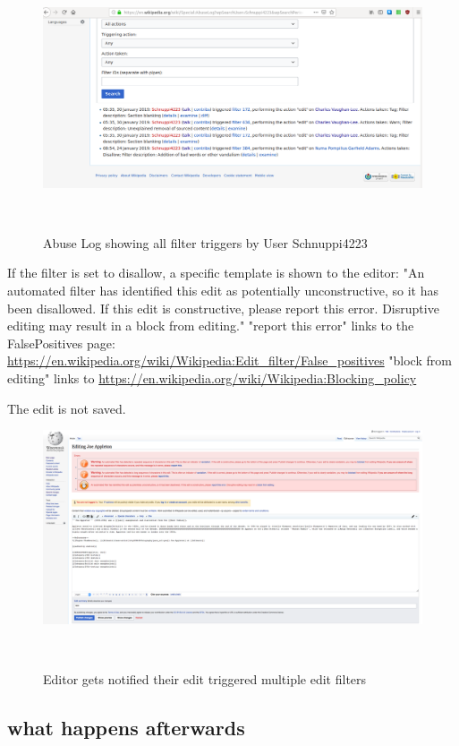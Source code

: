 \begin{figure}
\centering
  \includegraphics[width=0.9\columnwidth]{pics/screenshots-filter-trigger/Screenshot-abuse-log.png}
  \caption{Abuse Log showing all filter triggers by User Schnuppi4223}~\label{fig:screenshot-abuse-log}
\end{figure}

If the filter is set to disallow, a specific template is shown to the editor: "An automated filter has identified this edit as potentially unconstructive, so it has been disallowed. If this edit is constructive, please report this error. Disruptive editing may result in a block from editing."
"report this error" links to the FalsePositives page: \url{https://en.wikipedia.org/wiki/Wikipedia:Edit_filter/False_positives}
"block from editing" links to \url{https://en.wikipedia.org/wiki/Wikipedia:Blocking_policy}

The edit is not saved.

\begin{figure}
\centering
  \includegraphics[width=0.9\columnwidth]{pics/screenshots-filter-trigger/Screenshot-trigger-warning-filter.png}
  \caption{Editor gets notified their edit triggered multiple edit filters}~\label{fig:screenshot-warn-disallow}
\end{figure}

\subsection{what happens afterwards}

